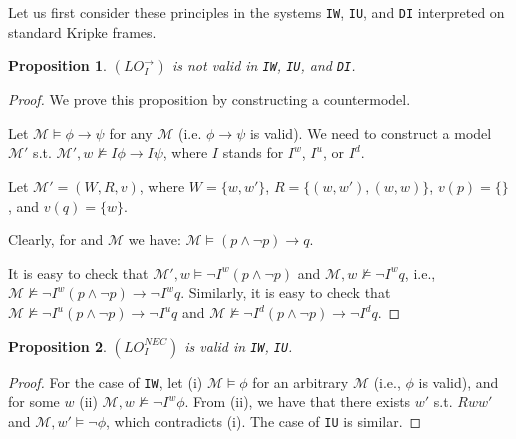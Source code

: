 \documentclass{article}
\newtheorem{prop}{Proposition}
\begin{document}
Let us first consider these principles in the systems \texttt{IW}, \texttt{IU}, and \texttt{DI} interpreted on standard Kripke frames.

\begin{prop}

$(LO^{\rightarrow}_{I})$ is not valid in \texttt{IW}, \texttt{IU}, and \texttt{DI}.

\end{prop}

\begin{proof}

We prove this proposition by constructing a countermodel.

Let $\mathcal{M} \models \phi \rightarrow \psi$ for any $\mathcal{M}$ (i.e. $\phi \rightarrow \psi$ is valid). We need to construct a model $\mathcal{M}'$ s.t. $\mathcal{M'}, w \not \models I \phi \rightarrow I \psi$, where $I$ stands for $I^{w}$, $I^{u}$, or $I^{d}$.


Let $\mathcal{M}' = (W, R, v)$, where $W = \{w, w'\}$, $R = \{(w,w'), (w,w)\}$, $v(p) = \{ \}$, and $v(q) = \{w\}$.

Clearly,  for and $\mathcal{M}$ we have: $\mathcal{M} \models (p \wedge \neg p) \rightarrow q$.

It is easy to check that $\mathcal{M}', w \models \neg I^{w} (p \wedge \neg p)$ and $\mathcal{M}, w \not \models \neg I^{w} q$, i.e., $\mathcal{M} \not \models \neg I^{w} (p \wedge \neg p) \rightarrow \neg I^{w} q$. Similarly, it is easy to check that $\mathcal{M} \not \models \neg I^{u} (p \wedge \neg p) \rightarrow \neg I^{u} q$ and $\mathcal{M} \not \models \neg I^{d} (p \wedge \neg p) \rightarrow \neg I^{d} q$.


\end{proof}

\begin{prop}

$(LO^{NEC}_{I})$ is valid in \texttt{IW}, \texttt{IU}.


\end{prop}

\begin{proof}

For the case of  \texttt{IW}, let (i) $\mathcal{M} \models \phi$ for an arbitrary $\mathcal{M}$ (i.e., $\phi$ is valid), and for some $w$ (ii) $\mathcal{M}, w \not \models \neg I^{w} \phi$. From (ii), we have that there exists $w'$ s.t. $Rww'$ and $\mathcal{M}, w' \models \neg \phi$, which contradicts (i). The case of \texttt{IU} is similar.


\end{proof}
\end{document}
